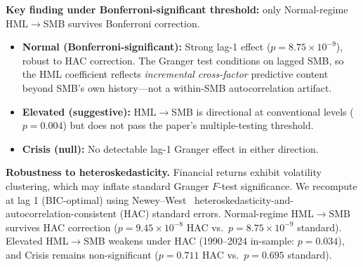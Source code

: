 \documentclass[sigconf,anonymous]{acmart}
\begin{document}
\textbf{Key finding under Bonferroni-significant threshold:} only Normal-regime
HML$\to$SMB survives Bonferroni correction.
\begin{itemize}
    \item \textbf{Normal (Bonferroni-significant):} Strong lag-1 effect
    ($p = 8.75 \times 10^{-9}$), robust to HAC correction. The Granger test conditions
    on lagged SMB, so the HML coefficient reflects \emph{incremental cross-factor}
    predictive content beyond SMB's own history---not a within-SMB autocorrelation artifact.
    \item \textbf{Elevated (suggestive):} HML$\to$SMB is directional at
    conventional levels ($p = 0.004$) but does not pass the paper's
    multiple-testing threshold.
    \item \textbf{Crisis (null):} No detectable lag-1 Granger effect in either
    direction.
\end{itemize}

\textbf{Robustness to heteroskedasticity.}
Financial returns exhibit volatility clustering, which may inflate standard Granger
$F$-test significance. We recompute at lag 1 (BIC-optimal) using Newey--West~\cite{newey1987simple}
heteroskedasticity-and-autocorrelation-consistent (HAC) standard errors.
Normal-regime HML$\to$SMB survives HAC correction
($p = 9.45 \times 10^{-8}$ HAC vs.\ $p = 8.75 \times 10^{-9}$ standard).
Elevated HML$\to$SMB weakens under HAC (1990--2024 in-sample: $p = 0.034$), and Crisis remains
non-significant ($p = 0.711$ HAC vs.\ $p = 0.695$ standard).
\end{document}
